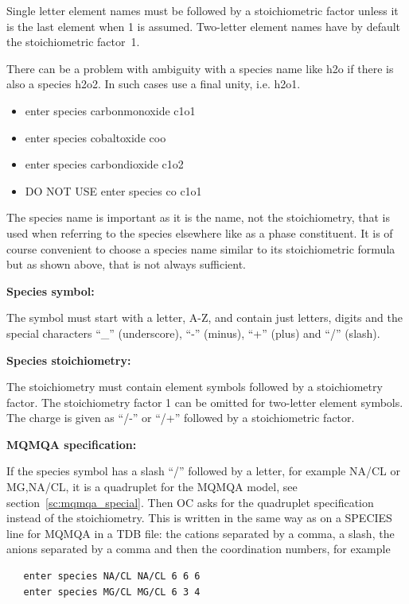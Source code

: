 \documentclass[11pt]{article}
\begin{document}
Single letter element names must be followed by a stoichiometric
factor unless it is the last element when 1 is assumed.  Two-letter
element names have by default the stoichiometric factor~1.

There can be a problem with ambiguity with a species name like h2o if
there is also a species h2o2.  In such cases use a final unity, i.e.
h2o1.

\begin{itemize}
\item enter species carbonmonoxide c1o1
\item enter species cobaltoxide coo
\item enter species carbondioxide c1o2
\item DO NOT USE enter species co c1o1
\end{itemize}

The species name is important as it is the name, not the
stoichiometry, that is used when referring to the species elsewhere
like as a phase constituent.  It is of course convenient to choose a
species name similar to its stoichiometric formula but as shown above,
that is not always sufficient.

{\bf Species symbol:}

The symbol must start with a letter, A-Z, and contain just letters,
digits and the special characters ``\_'' (underscore), ``-'' (minus),
 ``+'' (plus) and ``/'' (slash).

{\bf Species stoichiometry:}

The stoichiometry must contain element symbols followed by a
stoichiometry factor.  The stoichiometry factor 1 can be omitted for
two-letter element symbols.  The charge is given as ``/-'' or ``/+''
followed by a stoichiometric factor.

\hypertarget{Enter MQMQA species}{}
{\bf MQMQA specification:}

If the species symbol has a slash ``/'' followed by a letter, for
example NA/CL or MG,NA/CL, it is a quadruplet for the MQMQA model,
see section~\ref{sc:mqmqa_special}.  Then OC asks for the quadruplet
specification instead of the stoichiometry.  This is written in the
same way as on a SPECIES line for MQMQA in a TDB file: the cations
separated by a comma, a slash, the anions separated by a comma and
then the coordination numbers, for example

\begin{verbatim}
   enter species NA/CL NA/CL 6 6 6
   enter species MG/CL MG/CL 6 3 4
\end{verbatim}
\end{document}
